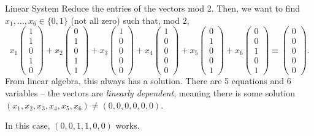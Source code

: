 \documentclass[aspectratio=169]{beamer}
\begin{document}
\begin{frame}{Linear System}
  Reduce the entries of the vectors mod 2.
  Then, we want to find $x_1, \dots, x_6 \in \{0, 1\}$ (not all zero) such that, mod 2,
  \[
  x_1 \begin{pmatrix} 1 \\ 1 \\ 0 \\ 1 \\ 0 \end{pmatrix} +
  x_2 \begin{pmatrix} 0 \\ 1 \\ 0 \\ 1 \\ 1 \end{pmatrix} +
  x_3 \begin{pmatrix} 1 \\ 0 \\ 0 \\ 0 \\ 0 \end{pmatrix} +
  x_4 \begin{pmatrix} 1 \\ 0 \\ 0 \\ 0 \\ 0 \end{pmatrix} +
  x_5 \begin{pmatrix} 0 \\ 1 \\ 0 \\ 0 \\ 1 \end{pmatrix} +
  x_6 \begin{pmatrix} 0 \\ 0 \\ 1 \\ 0 \\ 1 \end{pmatrix}
  \equiv \begin{pmatrix} 0 \\ 0 \\ 0 \\ 0 \\ 0 \end{pmatrix}.
  \] \pause
  From linear algebra, this always has a solution. There are 5 equations and 6 variables --
  the vectors are \textit{linearly dependent}, meaning there is some solution
  $(x_1, x_2, x_3, x_4, x_5, x_6) \ne (0, 0, 0, 0, 0, 0)$.
  \pause

  In this case, $(0, 0, 1, 1, 0, 0)$ works.
\end{frame}
\end{document}
